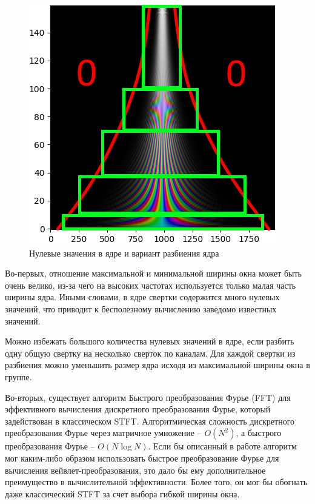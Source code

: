 \begin{figure}
  \includegraphics[width=0.9\linewidth]{figures/my_kernel_zeros}
  \caption{Нулевые значения в ядре и вариант разбиения ядра}
  \label{fig:my_kernel_zeros}
\end{figure}

Во-первых, отношение максимальной и минимальной ширины окна может быть очень велико, 
из-за чего на высоких частотах используется только малая часть ширины ядра. 
Иными словами, в ядре свертки содержится много нулевых значений, что приводит к бесполезному вычислению заведомо известных значений.

Можно избежать большого количества нулевых значений в ядре, если разбить одну общую свертку 
на несколько сверток по каналам. Для каждой свертки из разбиения можно уменьшить размер ядра исходя из максимальной ширины окна в группе.

Во-вторых, существует алгоритм Быстрого преобразования Фурье (FFT) для эффективного вычисления дискретного преобразования Фурье, 
который задействован в классическом STFT.
Алгоритмическая сложность дискретного преобразования Фурье через матричное умножение -- $O(N^2)$, 
а быстрого преобразования Фурье -- $O(N \log N)$.
Если бы описанный в работе алгоритм мог каким-либо образом использовать быстрое преобразование Фурье для вычисления вейвлет-преобразования,
это дало бы ему дополнительное преимущество в вычислительной эффективности. 
Более того, он мог бы обогнать даже классический STFT за счет выбора гибкой ширины окна.

